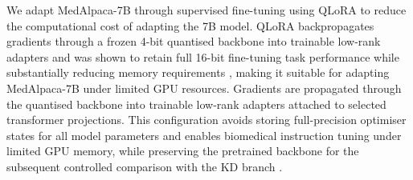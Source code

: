 \documentclass[conference]{IEEEtran}
\begin{document}





We adapt MedAlpaca-7B through supervised fine-tuning using QLoRA \cite{dettmers2023qlora} to reduce the computational cost of adapting the 7B model. QLoRA backpropagates gradients through a frozen 4-bit quantised backbone into trainable low-rank adapters and was shown to retain full 16-bit fine-tuning task performance while substantially reducing memory requirements \cite{dettmers2023qlora}, making it suitable for adapting MedAlpaca-7B under limited GPU resources. Gradients are propagated through the quantised backbone into trainable low-rank adapters attached to selected transformer projections. This configuration avoids storing full-precision optimiser states for all model parameters and enables biomedical instruction tuning under limited GPU memory, while preserving the pretrained backbone for the subsequent controlled comparison with the KD branch \cite{dettmers2023qlora}.
\end{document}
